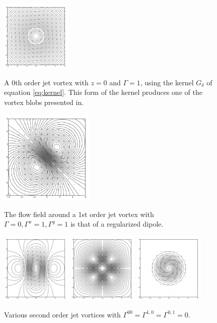 \documentclass[12pt]{amsart}
\theoremstyle{remark}
\begin{document}
\begin{figure}[p] %
   \centering
	\includegraphics[clip,trim=0.6in 0.5in 0.6in 0.6in,width=0.3\textwidth]{./images/zero.pdf} 
	\caption{
		A 0th order jet vortex with $z = 0$ and $\Gamma=1$, using the kernel $G_\delta$ of equation \eqref{eq:kernel}.
		This form of the kernel produces one of the vortex blobs presented in\cite{BealeMajda1985}.}
	\label{fig:zero}
	\includegraphics[clip,trim=0.6in 0.5in 0.6in 0.6in,width=0.4\textwidth]{./images/one.pdf} 
	\caption{The flow field around a 1st order jet vortex with $\Gamma = 0,\Gamma^x = 1,\Gamma^y=1$ is that of a regularized dipole.}
	\label{fig:one}
	\includegraphics[clip,trim =1in 1in 1in 1in,width=0.3\textwidth]{./images/two_xx.pdf} 
	\includegraphics[clip,trim =1in 1in 1in 1in,width=0.3\textwidth]{./images/two_xy.pdf} 
	\includegraphics[clip,trim =1in 1in 1in 1in,width=0.3\textwidth]{./images/two_xx_yy.pdf} 
	\caption{Various second order jet vortices with $\Gamma^{00} = \Gamma^{1,0} = \Gamma^{0,1} = 0$.}
	\label{fig:second}
\end{figure}
\end{document}
